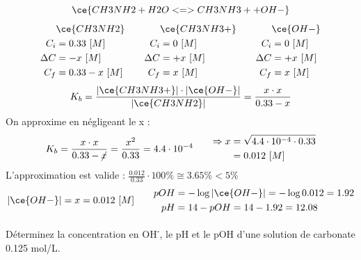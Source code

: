 \documentclass[
  11pt,
  a4paper,
  openany]{book}
\begin{document}
\begin{Answer}
\[
\ce{CH3NH2 + H2O <=> CH3NH3+ + OH-}
\]
\[
\begin{split}
&\ce{CH3NH2}\\
C_i &= 0.33\ [M] \\
\Delta C &= - x\ [M] \\
C_f &= 0.33 - x\ [M] \\
\end{split}
\qquad
\begin{split}
&\ce{CH3NH3+}\\
C_i &= 0\ [M] \\
\Delta C &= + x\ [M] \\
C_f &= x\ [M] \\
\end{split}
\qquad
\begin{split}
&\ce{OH-}\\
C_i &= 0\ [M] \\
\Delta C &= + x\ [M] \\
C_f &= x\ [M] \\
\end{split}
\]
\[
K_b = \frac{|\ce{CH3NH3+}| \cdot |\ce{OH-}|}{|\ce{CH3NH2}|} = \frac{x \cdot x}{0.33 - x}
\]
On approxime en négligeant le x :
\[
\begin{split}
K_b = \frac{x \cdot x}{0.33 - \cancel{x}} = \frac{x^2}{0.33} = 4.4 \cdot 10^{-4}
\end{split}
\qquad
\begin{split}
\Rightarrow x &= \sqrt{4.4 \cdot 10^{-4} \cdot 0.33} \\
  &= 0.012\ [M]
\end{split}
\]
L'approximation est valide : \(\frac{0.012}{0.33} \cdot 100\% \cong 3.65\% < 5\%\)
\[
\begin{split}
|\ce{OH-}| = x = 0.012\ [M] 
\end{split}
\qquad
\begin{split}
pOH &= - \log |\ce{OH-}| = - \log 0.012 = 1.92 \\
pH &= 14 - pOH = 14 - 1.92 = 12.08
\end{split}
\]

\end{Answer}

\begin{Exercise}
Déterminez la concentration en OH\textsuperscript{-}, le pH et le pOH d'une solution de carbonate 0.125 mol/L.

\end{Exercise}
\end{document}
